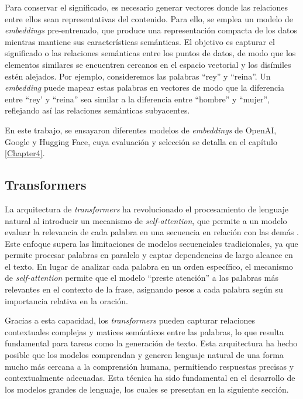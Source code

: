 Para conservar el significado, es necesario generar vectores donde las relaciones entre ellos sean representativas 
del contenido. Para ello, se emplea un modelo de \textit{embeddings} pre-entrenado, que produce una representación compacta 
de los datos mientras mantiene sus características semánticas. El objetivo es capturar el significado o las relaciones 
semánticas entre los puntos de datos, de modo que los elementos similares se encuentren cercanos en el espacio vectorial y los disímiles estén alejados. 
Por ejemplo, consideremos las palabras ``rey'' y ``reina''. Un \textit{embedding} puede mapear estas palabras en vectores de modo 
que la diferencia entre ``rey' y ``reina'' sea similar a la diferencia entre ``hombre'' y ``mujer'', reflejando así las 
relaciones semánticas subyacentes.

En este trabajo, se ensayaron diferentes modelos de \textit{embeddings} de OpenAI, Google y Hugging Face, 
cuya evaluación y selección se detalla en el capítulo \ref{Chapter4}.

\subsection{Transformers}

La arquitectura de \textit{transformers} ha revolucionado el procesamiento de lenguaje natural al introducir un mecanismo de \textit{self-attention}, 
que permite a un modelo evaluar la relevancia de cada palabra en una secuencia en relación con las demás \citep{paper:transformers}. Este enfoque 
supera las limitaciones de modelos secuenciales tradicionales, ya que permite procesar palabras en paralelo y captar dependencias de largo alcance 
en el texto. En lugar de analizar cada palabra en un orden específico, el mecanismo de \textit{self-attention} permite que el modelo ``preste atención'' 
a las palabras más relevantes en el contexto de la frase, asignando pesos a cada palabra según su importancia relativa en la oración.

Gracias a esta capacidad, los \textit{transformers} pueden capturar relaciones contextuales complejas y matices semánticos entre las palabras, 
lo que resulta fundamental para tareas como la generación de texto. Esta arquitectura ha hecho posible que los modelos comprendan y generen 
lenguaje natural de una forma mucho más cercana a la comprensión humana, permitiendo respuestas precisas y contextualmente adecuadas. Esta técnica 
ha sido fundamental en el desarrollo de los modelos grandes de lenguaje, los cuales se presentan en la siguiente sección.

